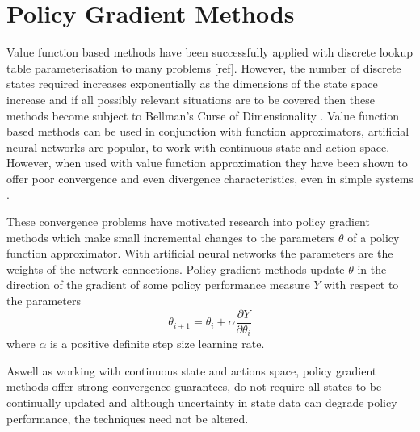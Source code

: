 \section{Policy Gradient Methods}
\label{sec:policygradient}
%
Value function based methods have been successfully applied with discrete lookup
table parameterisation to many problems [ref].  However, the number of discrete
states required increases exponentially as the dimensions of the state space
increase and if all possibly relevant situations are to be covered then these
methods become subject to Bellman's Curse of Dimensionality
\cite{bellman:1961}.  Value function based methods can be used in conjunction
with function approximators, artificial neural networks are popular, to work
with continuous state and action space.  However, when used with value
function approximation they have been shown to offer poor convergence and even
divergence characteristics, even in simple systems \cite{peters:enac}.

These convergence problems have motivated research into policy gradient methods
which make small incremental changes to the parameters $\theta$ of a policy
function approximator.  With artificial neural networks the parameters are
the weights of the network connections.  Policy gradient methods update
$\theta$ in the direction of the gradient of some policy performance measure
$Y$ with respect to the parameters
\begin{equation}
\theta_{i+1} = \theta_i + \alpha \frac{\partial Y}{\partial \theta_i}
\end{equation}
where $\alpha$ is a positive definite step size learning rate.

Aswell as working with continuous state and actions space, policy gradient
methods offer strong convergence guarantees, do not require all states to be
continually updated and although uncertainty in state data can degrade policy
performance, the techniques need not be altered.

